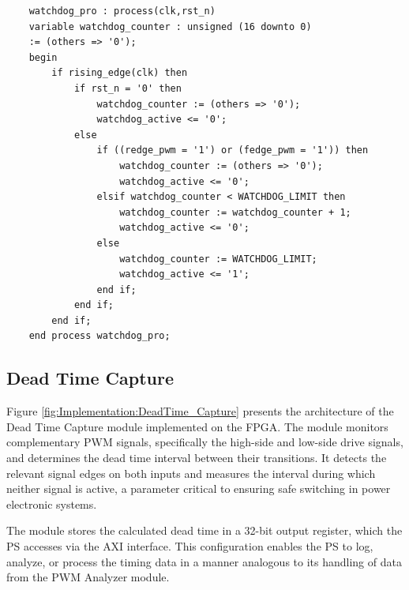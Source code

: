 \begin{lstlisting}
	watchdog_pro : process(clk,rst_n)       
	variable watchdog_counter : unsigned (16 downto 0) 
	:= (others => '0');        
	begin
		if rising_edge(clk) then
			if rst_n = '0' then
				watchdog_counter := (others => '0');
				watchdog_active <= '0';
			else
				if ((redge_pwm = '1') or (fedge_pwm = '1')) then
					watchdog_counter := (others => '0');
					watchdog_active <= '0';
				elsif watchdog_counter < WATCHDOG_LIMIT then
					watchdog_counter := watchdog_counter + 1;
					watchdog_active <= '0';
				else
					watchdog_counter := WATCHDOG_LIMIT;
					watchdog_active <= '1';
				end if;                
			end if;
		end if;
	end process watchdog_pro;
\end{lstlisting}

\subsection{Dead Time Capture}
\label{sec:Implementation:DeadTime}

Figure \ref{fig:Implementation:DeadTime_Capture} presents the architecture of the Dead Time Capture module implemented on the \acs{FPGA}. The module monitors complementary \acs{PWM} signals, specifically the high-side and low-side drive signals, and determines the dead time interval between their transitions. It detects the relevant signal edges on both inputs and measures the interval during which neither signal is active, a parameter critical to ensuring safe switching in power electronic systems.

The module stores the calculated dead time in a 32-bit output register, which the \acs{PS} accesses via the \acs{AXI} interface. This configuration enables the \acs{PS} to log, analyze, or process the timing data in a manner analogous to its handling of data from the \acs{PWM} Analyzer module.

